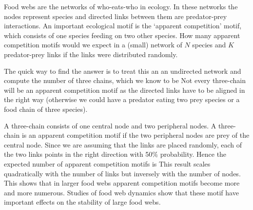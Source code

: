 
Food webs are the networks of who-eats-who in ecology. In these networks the nodes represent species and directed links between them are predator-prey interactions. An important ecological motif is the `apparent competition' motif, which consists of one species feeding on two other species. How many apparent competition motifs would we expect in a (small) network of $N$ species and $K$ predator-prey links if the links were distributed randomly. 

\solution

The quick way to find the answer is to treat this an an undirected network and compute the number of three chains, which we know to be 
Not every three-chain will be an apparent competition motif as the directed links have to be aligned in the right way (otherwise we could have a predator eating two prey species or a food chain of three species). 

A three-chain consists of one central node and two peripheral nodes. A three-chain is an apparent competition motif if the two peripheral nodes are prey of the central node. Since we are assuming that the links are placed randomly, each of the two links points in the right direction with 50\% probability. Hence the expected number of apparent competition motifs is 
This result scales quadratically with the number of links but inversely with the number of nodes. This shows that in larger food webs apparent competition motifs become more and more numerous. Studies of food web dynamics show that these motif have important effects on the stability of large food webs. 
